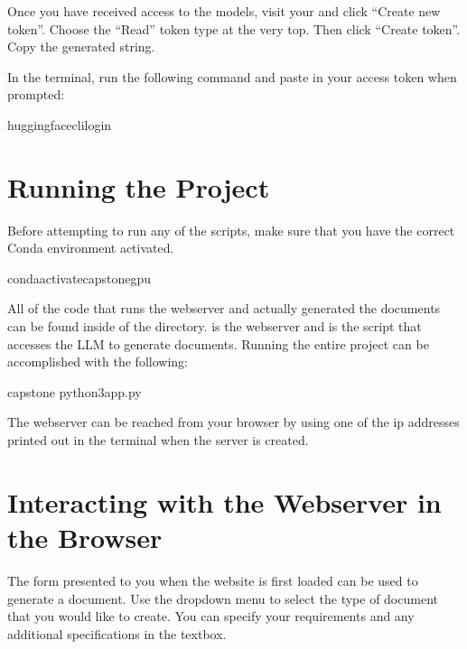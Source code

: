 \documentclass[letterpaper,10pt,english]{sphinxmanual}
\begin{document}
\sphinxAtStartPar
Once you have received access to the models, visit your  and click “Create new token”. Choose the “Read” token type at the very top. Then click “Create token”. Copy the generated string.

\sphinxAtStartPar
In the terminal, run the following command and paste in your access token when prompted:

\begin{sphinxVerbatim}[commandchars=\\\{\}]
 huggingface\PYGZhy{}clilogin
\end{sphinxVerbatim}


\section{Running the Project}
\label{\detokenize{usage:running-the-project}}
\sphinxAtStartPar
Before attempting to run any of the scripts, make sure that you have the correct Conda environment activated.

\begin{sphinxVerbatim}[commandchars=\\\{\}]
 condaactivatecapstone\PYGZus{}gpu
\end{sphinxVerbatim}

\sphinxAtStartPar
All of the code that runs the webserver and actually generated the documents can be found inside of the  directory.  is the webserver and  is the script that accesses the LLM to generate documents. Running the entire project can be accomplished with the following:

\begin{sphinxVerbatim}[commandchars=\\\{\}]
 capstone
 python3app.py
\end{sphinxVerbatim}

\sphinxAtStartPar
The webserver can be reached from your browser by using one of the ip addresses printed out in the terminal when the server is created.


\section{Interacting with the Webserver in the Browser}
\label{\detokenize{usage:interacting-with-the-webserver-in-the-browser}}
\sphinxAtStartPar
The form presented to you when the website is first loaded can be used to generate a document. Use the  dropdown menu to select the type of document that you would like to create. You can specify your requirements and any additional specifications in the  textbox.
\end{document}
